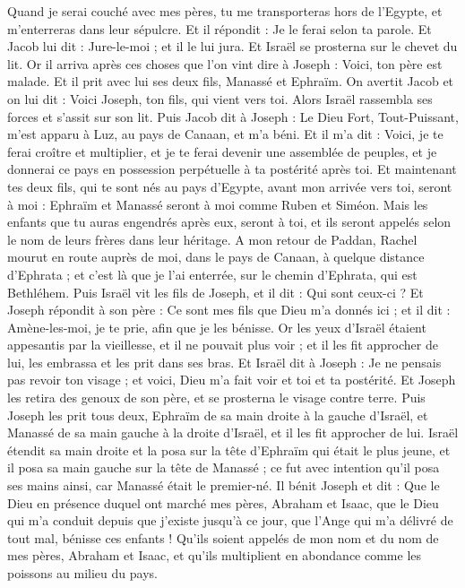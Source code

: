 \begin{multicols}{2}
Quand  je serai couché avec mes pères, tu me transporteras hors de l'Egypte, et m'enterreras dans leur sépulcre. Et il répondit : Je le ferai selon ta parole.
Et Jacob lui dit : Jure-le-moi ; et il le lui jura. Et Israël se prosterna sur le chevet du lit.
\VerseOne{}Or il arriva après ces choses que l'on vint dire à Joseph : Voici, ton père est malade. Et il prit avec lui ses deux fils, Manassé et Ephraïm.
On avertit Jacob et on lui dit : Voici Joseph, ton fils, qui vient vers toi. Alors Israël rassembla ses forces et s’assit sur son lit.
Puis Jacob dit à Joseph : Le Dieu Fort, Tout-Puissant, m’est apparu  à Luz, au pays de Canaan, et m’a béni.
Et il m’a dit : Voici, je te ferai croître et multiplier, et je te ferai devenir une assemblée de peuples, et je donnerai ce pays en possession perpétuelle à ta postérité après toi.
Et maintenant tes deux fils, qui te sont nés au pays d'Egypte, avant mon arrivée vers toi, seront à moi : Ephraïm et Manassé seront à moi comme Ruben et Siméon.
Mais les enfants que tu auras engendrés après eux, seront à toi, et ils seront appelés selon le nom de leurs frères dans leur héritage.
A mon retour de Paddan, Rachel mourut en route auprès de moi, dans le pays de Canaan, à quelque distance d’Ephrata ; et c’est là que je l’ai enterrée, sur le chemin d’Ephrata, qui est Bethléhem.
Puis Israël vit les fils de Joseph, et il dit : Qui sont ceux-ci ?
Et Joseph répondit à son père : Ce sont mes fils que Dieu m'a donnés ici ; et il dit : Amène-les-moi, je te prie, afin que je les bénisse.
Or les yeux d'Israël étaient appesantis par la vieillesse, et il ne pouvait plus voir ; et il les fit approcher de lui, les embrassa et les prit dans ses bras.
Et Israël dit à Joseph : Je ne pensais pas revoir ton visage ; et voici, Dieu m'a fait voir et toi et ta postérité.
Et Joseph les retira des genoux de son père, et se prosterna le visage contre terre.
Puis Joseph les prit tous deux, Ephraïm de sa main droite à la gauche d’Israël, et Manassé de sa main gauche à la droite d’Israël, et il les fit approcher de lui.
Israël étendit sa main droite et la posa sur la tête d’Ephraïm qui était le plus jeune, et il posa sa main gauche sur la tête de Manassé ; ce fut avec intention qu’il posa ses mains ainsi, car Manassé était le premier-né.
Il bénit Joseph et dit : Que le Dieu en présence duquel ont marché mes pères, Abraham et Isaac, que le Dieu qui m’a conduit depuis que j’existe jusqu’à ce jour,
que l’Ange qui m’a délivré de tout mal, bénisse ces enfants ! Qu’ils soient appelés de mon nom et du nom de mes pères, Abraham et Isaac, et qu’ils multiplient en abondance comme les poissons au milieu du pays.

\end{multicols}
